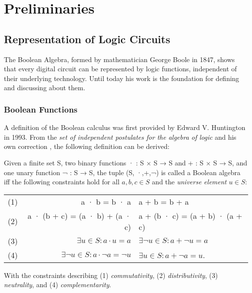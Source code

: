 \chapter{Preliminaries}\label{chapter:Preliminaries}

\section{Representation of Logic Circuits}
The Boolean Algebra, formed by mathematician George Boole in 1847, shows that every digital circuit can be represented by logic functions, independent of their underlying technology. Until today his work is the foundation for defining and discussing about them.

\subsection{Boolean Functions}\label{subsec:boolfunc}
A definition of the Boolean calculus was first provided by Edward V. Huntington in 1993. From the \textit{set of independent postulates for the algebra of logic} and his own correction \cite{HuntingtonPostulate, HuntingtonCorrection}, the following definition can be derived:

\begin{definition}\label{Def:BasBool}
Given a finite set S, two binary functions · : S × S → S and + :
S × S → S, and one unary function ¬ : S → S, the tuple (S, ·,+,¬) is called a
Boolean algebra iff the following constraints hold for all $a, b, c \in S$ and the \textit{universe element} $u \in S$: \\

\centering
\begin{tabular}{l r l}

	     (1) & a · b = b · a & a + b = b + a \\
	     (2) &a · (b + c) = (a · b) + (a · c) & a + (b · c) = (a + b) · (a + c) \\
	     (3) & $\exists u \in S : a \cdot u = a$ &  $\exists \neg u \in S : a + \neg u = a$ \\
	     (4) &$\exists \neg u \in S : a \cdot \neg a = \neg u$ & $\exists u \in S : a + \neg a = u$. \\

\end{tabular}

\end{definition}

With the constraints describing (1) \textit{commutativity}, (2) \textit{distributivity}, (3) \textit{neutrality}, and (4)
\textit{complementarity}.\\

